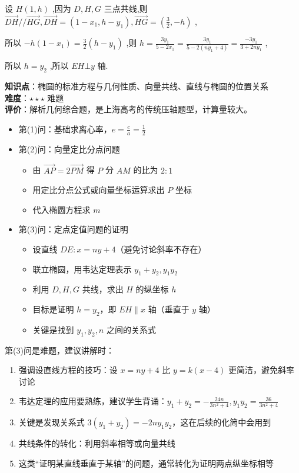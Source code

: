 \documentclass[10pt]{article}
\begin{document}
设 \(H\left( {1,h}\right)\) ,因为 \(D,H,G\) 三点共线,则 \(\overrightarrow{DH}//\overrightarrow{HG},\overrightarrow{DH} = \left( {1 - {x}_{1},h - {y}_{1}}\right) ,\overrightarrow{HG} = \left( {\frac{3}{2}, - h}\right)\) ,

所以 \(- h\left( {1 - {x}_{1}}\right)  = \frac{3}{2}\left( {h - {y}_{1}}\right)\) ,则 \(h = \frac{3{y}_{1}}{5 - 2{x}_{1}} = \frac{3{y}_{1}}{5 - 2\left( {n{y}_{1} + 4}\right) } = \frac{-3{y}_{1}}{3 + {2n}{y}_{1}}\) ,

所以 \(h = {y}_{2}\) ,所以 \({EH} \bot  y\) 轴.

\begin{analysisbox}[考点分析]
\textbf{知识点}：椭圆的标准方程与几何性质、向量共线、直线与椭圆的位置关系\\
\textbf{难度}：\(\star\star\star\) 难题\\
\textbf{评价}：解析几何综合题，是上海高考的传统压轴题型，计算量较大。
\begin{itemize}
\item 第(1)问：基础求离心率，\(e = \frac{c}{a} = \frac{1}{2}\)
\item 第(2)问：向量定比分点问题
  \begin{itemize}
  \item 由 \(\overrightarrow{AP} = 2\overrightarrow{PM}\) 得 \(P\) 分 \(AM\) 的比为 \(2:1\)
  \item 用定比分点公式或向量坐标运算求出 \(P\) 坐标
  \item 代入椭圆方程求 \(m\)
  \end{itemize}
\item 第(3)问：定点定值问题的证明
  \begin{itemize}
  \item 设直线 \(DE: x = ny + 4\)（避免讨论斜率不存在）
  \item 联立椭圆，用韦达定理表示 \(y_1 + y_2, y_1y_2\)
  \item 利用 \(D,H,G\) 共线，求出 \(H\) 的纵坐标 \(h\)
  \item 目标是证明 \(h = y_2\)，即 \(EH \parallel x\) 轴（垂直于 \(y\) 轴）
  \item 关键是找到 \(y_1, y_2, n\) 之间的关系式
  \end{itemize}
\end{itemize}
\end{analysisbox}

\begin{tipbox}[教学提示]
第(3)问是难题，建议讲解时：
\begin{enumerate}
\item 强调设直线方程的技巧：设 \(x = ny + 4\) 比 \(y = k(x-4)\) 更简洁，避免斜率讨论
\item 韦达定理的应用要熟练，建议学生背诵：\(y_1+y_2 = -\frac{24n}{3n^2+4}, y_1y_2 = \frac{36}{3n^2+4}\)
\item 关键是发现关系式 \(3(y_1+y_2) = -2ny_1y_2\)，这在后续的化简中会用到
\item 共线条件的转化：利用斜率相等或向量共线
\item 这类``证明某直线垂直于某轴''的问题，通常转化为证明两点纵坐标相等
\end{enumerate}
\end{tipbox}
\end{document}
